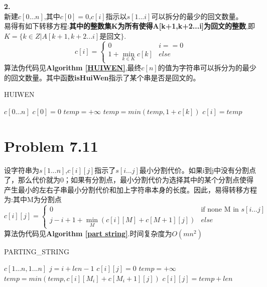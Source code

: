 \documentclass[onecolumn]{ctexart}
\begin{document}
\noindent \textbf{2.}\\
\indent 新建$c[0...n]$,其中$c[0]=0$,$c[i]$指示以$s[1...i]$可以拆分的最少的回文数量。\\
\indent 易得有如下转移方程:\textbf{其中的整数集K为所有使得A[k+1,k+2...i]为回文的整数},即$K=\{k\in Z |A[k+1,k+2...i]\text{是回文}\}$.\\
$$
c[i]=
\begin{cases}
0 & i==0\\
1+\min \limits_{k\in K}{c[k]} &else
\end{cases}
$$
\indent 算法伪代码见\textbf{Algorithm \ref{HUIWEN}},最终$c[n]$的值为字符串可以拆分为的最少的回文数量。其中函数\textbf{isHuiWen}指示了某个串是否是回文的。\\
\begin{algorithm}[htbp]
	\caption{HUIWEN}
	\label{HUIWEN}
	\begin{algorithmic}[1]
		\STATE $c[0...n]$
		\STATE $c[0]=0$
			\STATE $temp=+\infty$
					\STATE $temp=min(temp,1+c[k])$
				\ENDIF
			\STATE $c[i]=temp$
			\ENDFOR
		\ENDFOR
	\end{algorithmic}
\end{algorithm}


\section*{Problem 7.11}
\indent 设字符串为$s[1...n]$,$c[i][j]$指示了$s[i...j]$最小分割代价。如果i到j中没有分割点了，那么代价就为0；如果有分割点，最小分割代价为选择其中的某个分割点使得产生最小的左右子串最小分割代价和加上字符串本身的长度。因此，易得转移方程为:其中M为分割点\\
$$
c[i][j]=
\begin{cases}
0 & \text{if none M in }s[i...j]\\
j-i+1+\min \limits_{M} (c[i][M]+c[M+1][j])&else
\end{cases}
$$
\indent 算法伪代码见\textbf{Algorithm \ref{part string}}.时间复杂度为$O(mn^2)$
\begin{algorithm}[htbp]
	\caption{PARTING\_STRING}
	\label{part string}
	\begin{algorithmic}[1]
		\STATE $c[1...n,1...n]$
				\STATE $j=i+len-1$
					\STATE $c[i][j]=0$
				\ELSE
					\STATE $temp=+\infty$
						\STATE $temp=min(temp,c[i][M_i]+c[M_i+1][j])$
					\ENDFOR
					\STATE $c[i][j]=temp+len$
				\ENDIF
			\ENDFOR
		\ENDFOR
	\end{algorithmic}
\end{algorithm}
\end{document}
